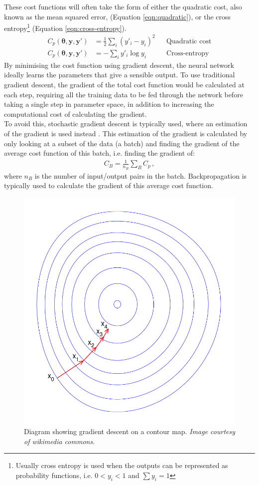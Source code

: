 \documentclass[11pt,a4paper,onecolumn]{report}
\begin{document}
These cost functions will often take the form of either the quadratic cost, also
known as the mean squared error, (Equation \ref{eqn:quadratic}), or the cross
entropy\footnote{Usually cross entropy is used when the outputs can be
represented as probability functions, i.e. \( 0 < y_i < 1\) and \(\sum y_i =
1\)} (Equation \ref{eqn:cross-entropy}).
\begin{align}
  C_p(\bm{\theta}, \bm{y}, \bm{y'}) &= \frac{1}{2} \sum\limits_{i}
    \left(y'_i - y_i\right)^2 && \text{Quadratic cost} \label{eqn:quadratic}\\
  C_p(\bm{\theta}, \bm{y}, \bm{y'}) &= - \sum\limits_{i}
  y'_i \log{y_i} && \text{Cross-entropy} \label{eqn:cross-entropy}
\end{align}
By minimising the cost function using gradient descent, the neural network
ideally learns the parameters that give a sensible output. To use traditional
gradient descent, the gradient of the total cost function would be calculated at
each step, requiring all the training data to be fed through the network before
taking a single step in parameter space, in addition to increasing the
computational cost of calculating the gradient.\\

To avoid this, stochastic gradient descent is typically used, where an
estimation of the gradient is used instead \citep{Bottou2010}. This estimation of
the gradient is calculated by only looking at a subset of the data (a batch) and
finding the gradient of the average cost function of this batch, i.e. finding
the gradient of:
\begin{align}
  C_B = \frac{1}{n_B} \sum\limits_{B} C_p \label{eqn:average cost}\,,
\end{align}
where \(n_B\) is the number of input/output pairs in the batch. Backpropagation
\citep{rumelhart_learning_1986} is typically used to calculate the gradient of
this average cost function.

\begin{figure}[t]
  \centering
  \includegraphics[width = 0.4\linewidth]{gradient_descent.png}
  \caption{Diagram showing gradient descent on a contour map. \textit{Image
  courtesy of wikimedia commons.}}
  \label{fig:gradient_descent}
\end{figure}
\end{document}
